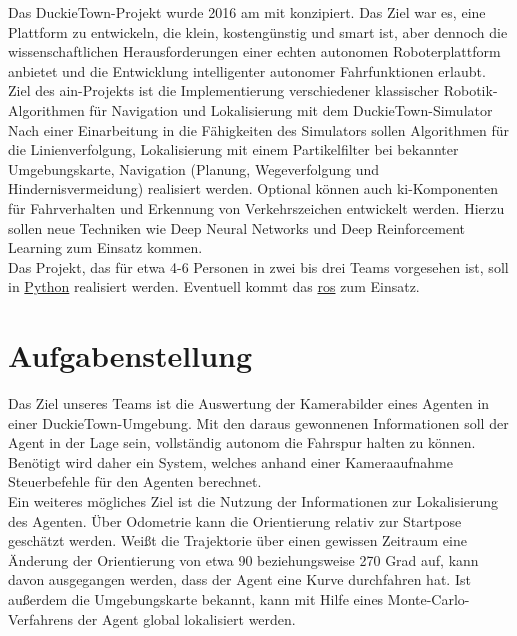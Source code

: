 \addtocounter{footnote}{-1}

Das DuckieTown-Projekt wurde 2016 am \acf{mit} konzipiert. Das Ziel war es, eine Plattform zu
entwickeln, die klein, kostengünstig und \grqq smart\grqq{} ist, aber dennoch die wissenschaftlichen
Herausforderungen einer echten autonomen Roboterplattform anbietet und die Entwicklung
intelligenter autonomer Fahrfunktionen erlaubt. \cite{duckietown}\\

\noindent Ziel des \acs{ain}-Projekts ist die Implementierung verschiedener klassischer Robotik-Algorithmen
für Navigation und Lokalisierung mit dem DuckieTown-Simulator\\

\noindent Nach einer Einarbeitung in die Fähigkeiten des Simulators sollen Algorithmen für die
Linienverfolgung, Lokalisierung mit einem Partikelfilter bei bekannter Umgebungskarte,
Navigation (Planung, Wegeverfolgung und Hindernisvermeidung) realisiert werden. Optional können auch \acs{ki}-Komponenten für
Fahrverhalten und Erkennung von Verkehrszeichen entwickelt werden. Hierzu sollen neue
Techniken wie Deep Neural Networks und Deep Reinforcement Learning zum Einsatz
kommen.\\

\noindent Das Projekt, das für etwa 4-6 Personen in zwei bis drei Teams vorgesehen ist, soll in \href{https://www.python.org/}{Python} realisiert werden.
Eventuell kommt das \href{https://www.ros.org/}{\acf{ros}} zum Einsatz.

\newpage

\section{Aufgabenstellung}
\label{aufgabenstellung}

Das Ziel unseres Teams ist die Auswertung der Kamerabilder eines Agenten in einer DuckieTown-Umgebung. Mit den daraus gewonnenen Informationen soll der Agent in der Lage sein, vollständig autonom die Fahrspur halten zu können. Benötigt wird daher ein System, welches anhand einer Kameraaufnahme Steuerbefehle für den Agenten berechnet. \\

Ein weiteres mögliches Ziel ist die Nutzung der Informationen zur Lokalisierung des Agenten. Über Odometrie kann die Orientierung relativ zur Startpose geschätzt werden. Weißt die Trajektorie über einen gewissen Zeitraum eine Änderung der Orientierung von etwa 90 beziehungsweise 270 Grad auf, kann davon ausgegangen werden, dass der Agent eine Kurve durchfahren hat. Ist außerdem die Umgebungskarte bekannt, kann mit Hilfe eines Monte-Carlo-Verfahrens der Agent global lokalisiert werden.\\

